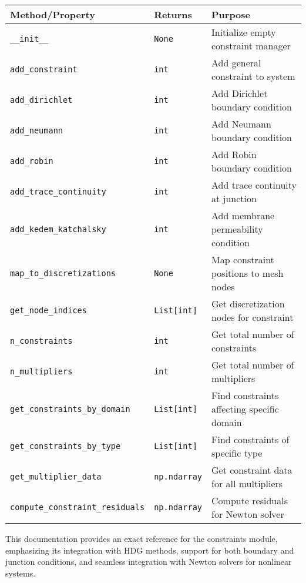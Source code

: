 \begin{longtable}{|p{5.5cm}|p{2cm}|p{6.5cm}|}
\hline
\textbf{Method/Property} & \textbf{Returns} & \textbf{Purpose} \\
\hline
\endhead

\texttt{\_\_init\_\_} & \texttt{None} & Initialize empty constraint manager \\
\hline

\texttt{add\_constraint} & \texttt{int} & Add general constraint to system \\
\hline

\texttt{add\_dirichlet} & \texttt{int} & Add Dirichlet boundary condition \\
\hline

\texttt{add\_neumann} & \texttt{int} & Add Neumann boundary condition \\
\hline

\texttt{add\_robin} & \texttt{int} & Add Robin boundary condition \\
\hline

\texttt{add\_trace\_continuity} & \texttt{int} & Add trace continuity at junction \\
\hline

\texttt{add\_kedem\_katchalsky} & \texttt{int} & Add membrane permeability condition \\
\hline

\texttt{map\_to\_discretizations} & \texttt{None} & Map constraint positions to mesh nodes \\
\hline

\texttt{get\_node\_indices} & \texttt{List[int]} & Get discretization nodes for constraint \\
\hline

\texttt{n\_constraints} & \texttt{int} & Get total number of constraints \\
\hline

\texttt{n\_multipliers} & \texttt{int} & Get total number of multipliers \\
\hline

\texttt{get\_constraints\_by\_domain} & \texttt{List[int]} & Find constraints affecting specific domain \\
\hline

\texttt{get\_constraints\_by\_type} & \texttt{List[int]} & Find constraints of specific type \\
\hline

\texttt{get\_multiplier\_data} & \texttt{np.ndarray} & Get constraint data for all multipliers \\
\hline

\texttt{compute\_constraint\_residuals} & \texttt{np.ndarray} & Compute residuals for Newton solver \\
\hline

\end{longtable}

This documentation provides an exact reference for the constraints module, emphasizing its integration with HDG methods, support for both boundary and junction conditions, and seamless integration with Newton solvers for nonlinear systems.

